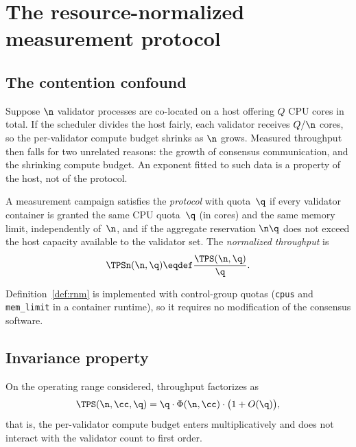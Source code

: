 \section{The resource-normalized measurement protocol}
\label{sec:rnm}

\subsection{The contention confound}

Suppose $\n$ validator processes are co-located on a host offering $Q$ CPU cores
in total. If the scheduler divides the host fairly, each validator receives
$Q/\n$ cores, so the per-validator compute budget shrinks as $\n$ grows.
Measured throughput then falls for two unrelated reasons: the growth of
consensus communication, and the shrinking compute budget. An exponent fitted
to such data is a property of the host, not of the protocol.

\begin{Def}
\label{def:rnm}
A measurement campaign satisfies the \emph{\RNM{} protocol} with quota~$\q$ if
every validator container is granted the same CPU quota~$\q$ (in cores) and the
same memory limit, independently of~$\n$, and if the aggregate reservation
$\n\q$ does not exceed the host capacity available to the validator set. The
\emph{normalized throughput} is
\begin{equation}
\TPSn(\n,\q)\eqdef\frac{\TPS(\n,\q)}{\q}.
\label{eq:normalized-tps}
\end{equation}
\end{Def}

Definition~\ref{def:rnm} is implemented with control-group quotas
(\texttt{cpus} and \texttt{mem\_limit} in a container runtime), so it requires
no modification of the consensus software.

\subsection{Invariance property}

\begin{Assumption}
\label{as:separable}
On the operating range considered, throughput factorizes as
\begin{equation}
\TPS(\n,\cc,\q)=\q\cdot\Phi(\n,\cc)\cdot\bigl(1+O(\q)\bigr),
\label{eq:separable}
\end{equation}
that is, the per-validator compute budget enters multiplicatively and does not
interact with the validator count to first order.
\end{Assumption}

